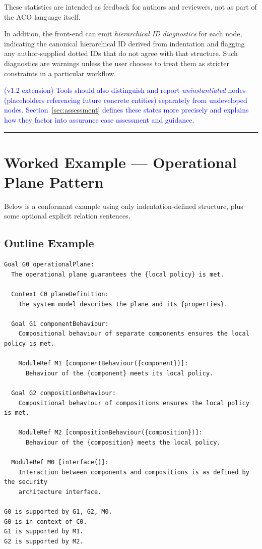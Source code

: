 \documentclass[11pt,twoside,a4paper]{article}
\begin{document}
These statistics are intended as feedback for authors and reviewers, not as part of the ACO language itself.

In addition, the front-end can emit \emph{hierarchical ID diagnostics} for each node, indicating the canonical hierarchical ID derived from indentation and flagging any author-supplied dotted IDs that do not agree with that structure. Such diagnostics are warnings unless the user chooses to treat them as stricter constraints in a particular workflow.

\textcolor{blue}{(v1.2 extension) Tools should also distinguish and report \emph{uninstantiated} nodes (placeholders referencing future concrete entities) separately from undeveloped nodes. Section~\ref{sec:assessment} defines these states more precisely and explains how they factor into assurance case assessment and guidance.}

\bigskip
\hrule
\bigskip

\section{Worked Example --- Operational Plane Pattern}

Below is a conformant example using only indentation-defined structure, plus some optional explicit relation sentences.

\subsection{Outline Example}\label{sec:aco_example}

\begin{verbatim}
Goal G0 operationalPlane:
  The operational plane guarantees the {local policy} is met.

  Context C0 planeDefinition:
    The system model describes the plane and its {properties}.

  Goal G1 componentBehaviour:
    Compositional behaviour of separate components ensures the local policy is met.

    ModuleRef M1 [componentBehaviour({component})]:
      Behaviour of the {component} meets its local policy.

  Goal G2 compositionBehaviour:
    Compositional behaviour of compositions ensures the local policy is met.

    ModuleRef M2 [compositionBehaviour({composition})]:
      Behaviour of the {composition} meets the local policy.

  ModuleRef M0 [interface()]:
    Interaction between components and compositions is as defined by the security
    architecture interface.

G0 is supported by G1, G2, M0.
G0 is in context of C0.
G1 is supported by M1.
G2 is supported by M2.
\end{verbatim}
\end{document}
